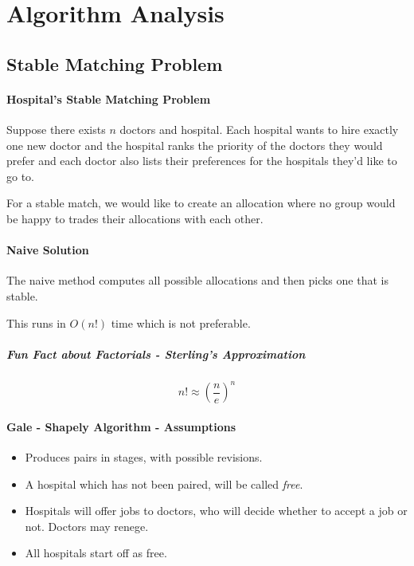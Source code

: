 \section{Algorithm Analysis}

\subsection{Stable Matching Problem}

\paragraph{Hospital's Stable Matching Problem}
Suppose there exists \(n\) doctors and hospital. Each hospital wants to
hire exactly one new doctor and the hospital ranks the priority of the
doctors they would prefer and each doctor also lists their preferences for
the hospitals they'd like to go to.

For a stable match, we would like to create an allocation where no group
would be happy to trades their allocations with each other.

\paragraph{Naive Solution}
The naive method computes all possible allocations and then picks one that
is stable.

This runs in \(O(n!)\) time which is not preferable.

\subparagraph{Fun Fact about Factorials - Sterling's Approximation}
\[n! \approx \left(\frac{n}{e}\right)^n\]

\paragraph{Gale - Shapely Algorithm - Assumptions}
\begin{itemize}
    \item Produces pairs in stages, with possible revisions.
    \item A hospital which has not been paired, will be called \textit{free}.
    \item Hospitals will offer jobs to doctors, who will decide whether to
    accept a job or not. Doctors may renege.
    \item All hospitals start off as free.
\end{itemize}

